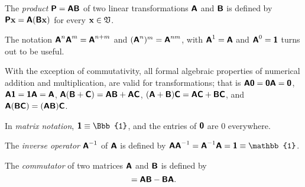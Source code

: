 The {\em product}
$\textsf{\textbf{P}} =\textsf{\textbf{A}} \textsf{\textbf{B}} $
of two linear transformations $\textsf{\textbf{A}}$ and $\textsf{\textbf{B}} $
is defined by
$\textsf{\textbf{P}} {\bf x}=\textsf{\textbf{A}}(\textsf{\textbf{B}} {\bf x})$
for every ${\bf x}\in {\frak V}$.

The notation
$\textsf{\textbf{A}}^n\textsf{\textbf{A}}^m=\textsf{\textbf{A}}^{n+m}$
and $(\textsf{\textbf{A}}^n)^m= \textsf{\textbf{A}}^{nm}$,
with $\textsf{\textbf{A}}^1=\textsf{\textbf{A}}$ and
$\textsf{\textbf{A}}^0 =\textsf{\textbf{1}}$ turns out to be useful.

With the exception of commutativity, all formal algebraic properties
of numerical addition and multiplication,
are valid for transformations; that is
$
\textsf{\textbf{A}}\textsf{\textbf{0}}=
\textsf{\textbf{0}}\textsf{\textbf{A}} =\textsf{\textbf{0}}
$,
$
\textsf{\textbf{A}}\textsf{\textbf{1}}=
\textsf{\textbf{1}}\textsf{\textbf{A}} =\textsf{\textbf{A}}
$,
$
\textsf{\textbf{A}} (\textsf{\textbf{B}}+\textsf{\textbf{C}})=
\textsf{\textbf{A}} \textsf{\textbf{B}}
+
\textsf{\textbf{A}} \textsf{\textbf{C}}
$,
$
(\textsf{\textbf{A}}+ \textsf{\textbf{B}})\textsf{\textbf{C}}=
\textsf{\textbf{A}} \textsf{\textbf{C}}
+
\textsf{\textbf{B}} \textsf{\textbf{C}}
$,  and
$
\textsf{\textbf{A}} (\textsf{\textbf{B}}\textsf{\textbf{C}})=
(\textsf{\textbf{A}} \textsf{\textbf{B}})
 \textsf{\textbf{C}}
$.

In {\em matrix notation},  $\textsf{\textbf{1}} \equiv {\Bbb{1}}$,
and the entries of $\textsf{\textbf{0}}$
are $0$ everywhere.

The {\em inverse operator}
$\textsf{\textbf{A}}^{-1}$
of $\textsf{\textbf{A}}$
is defined by
$\textsf{\textbf{A}}\textsf{\textbf{A}}^{-1}=\textsf{\textbf{A}}^{-1}\textsf{\textbf{A}}=
\textsf{\textbf{1}} \equiv \mathbb{1}$.


The {\em commutator}
of two matrices $\textsf{\textbf{A}}$  and $\textsf{\textbf{B}}$ is defined by
\begin{equation}
[\textsf{\textbf{A}}, \textsf{\textbf{B}} ]
=
\textsf{\textbf{A}} \textsf{\textbf{B}}
-
 \textsf{\textbf{B}}      \textsf{\textbf{A}}.
\label{2020-commutator}
\end{equation}



